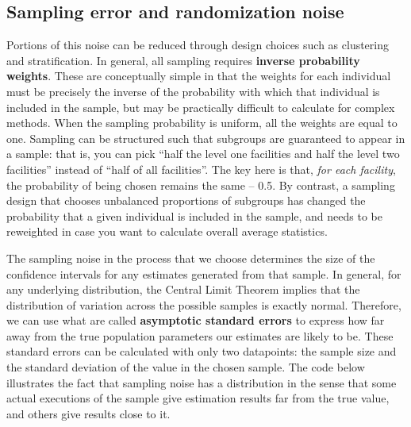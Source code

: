 \subsection{Sampling error and randomization noise}

Portions of this noise can be reduced through design choices
such as clustering and stratification.
In general, all sampling requires \textbf{inverse probability weights}.
These are conceptually simple in that the weights for each individual must be precisely the inverse of the probability
with which that individual is included in the sample, but may be practically difficult to calculate for complex methods.
When the sampling probability is uniform, all the weights are equal to one.
Sampling can be structured such that subgroups are guaranteed to appear in a sample:
that is, you can pick ``half the level one facilities and half the level two facilities'' instead of
``half of all facilities''. The key here is that, \textit{for each facility},
the probability of being chosen remains the same -- 0.5.
By contrast, a sampling design that chooses unbalanced proportions of subgroups
has changed the probability that a given individual is included in the sample,
and needs to be reweighted in case you want to calculate overall average statistics.

The sampling noise in the process that we choose
determines the size of the confidence intervals
for any estimates generated from that sample.
In general, for any underlying distribution,
the Central Limit Theorem implies that
the distribution of variation across the possible samples is exactly normal.
Therefore, we can use what are called \textbf{asymptotic standard errors}
to express how far away from the true population parameters our estimates are likely to be.
These standard errors can be calculated with only two datapoints:
the sample size and the standard deviation of the value in the chosen sample.
The code below illustrates the fact that sampling noise
has a distribution in the sense that some actual executions of the sample
give estimation results far from the true value,
and others give results close to it.

